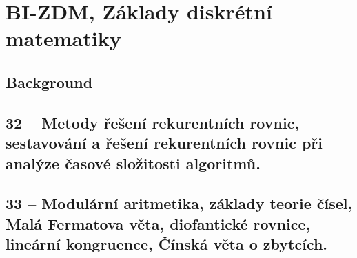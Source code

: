 \chapter{BI-ZDM, Základy diskrétní matematiky}

\section{Background}

\section{32 -- Metody řešení rekurentních rovnic, sestavování a řešení rekurentních rovnic při analýze časové složitosti algoritmů.}

\section{33 -- Modulární aritmetika, základy teorie čísel, Malá Fermatova věta, diofantické rovnice, lineární kongruence, Čínská věta o zbytcích.}
